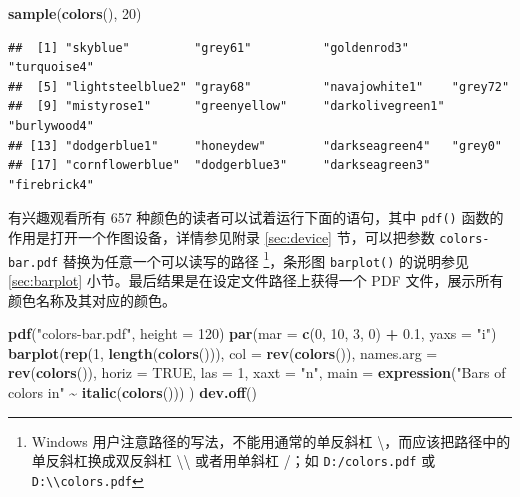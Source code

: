 \documentclass[
  b5paper,
  UTF8,twoside]{book}
\newenvironment{Shaded}{\begin{snugshade}}{\end{snugshade}}
\newcommand{\AttributeTok}[1]{\textcolor[rgb]{0.13,0.29,0.53}{#1}}
\newcommand{\ConstantTok}[1]{\textcolor[rgb]{0.56,0.35,0.01}{#1}}
\newcommand{\DecValTok}[1]{\textcolor[rgb]{0.00,0.00,0.81}{#1}}
\newcommand{\FloatTok}[1]{\textcolor[rgb]{0.00,0.00,0.81}{#1}}
\newcommand{\FunctionTok}[1]{\textcolor[rgb]{0.13,0.29,0.53}{\textbf{#1}}}
\newcommand{\NormalTok}[1]{#1}
\newcommand{\SpecialCharTok}[1]{\textcolor[rgb]{0.81,0.36,0.00}{\textbf{#1}}}
\newcommand{\StringTok}[1]{\textcolor[rgb]{0.31,0.60,0.02}{#1}}
\begin{document}
\begin{Shaded}
\begin{Highlighting}[]
\FunctionTok{sample}\NormalTok{(}\FunctionTok{colors}\NormalTok{(), }\DecValTok{20}\NormalTok{)}
\end{Highlighting}
\end{Shaded}

\begin{verbatim}
##  [1] "skyblue"         "grey61"          "goldenrod3"      "turquoise4"     
##  [5] "lightsteelblue2" "gray68"          "navajowhite1"    "grey72"         
##  [9] "mistyrose1"      "greenyellow"     "darkolivegreen1" "burlywood4"     
## [13] "dodgerblue1"     "honeydew"        "darkseagreen4"   "grey0"          
## [17] "cornflowerblue"  "dodgerblue3"     "darkseagreen3"   "firebrick4"
\end{verbatim}

有兴趣观看所有 657 种颜色的读者可以试着运行下面的语句，其中 \texttt{pdf()} 函数的作用是打开一个作图设备，详情参见附录 \ref{sec:device} 节，可以把参数 \texttt{\textquotesingle{}colors-bar.pdf\textquotesingle{}} 替换为任意一个可以读写的路径 \footnote{Windows 用户注意路径的写法，不能用通常的单反斜杠 \textbackslash，而应该把路径中的单反斜杠换成双反斜杠 \textbackslash\textbackslash{} 或者用单斜杠 /；如 \texttt{D:/colors.pdf} 或 \texttt{D:\textbackslash{}\textbackslash{}colors.pdf}}，条形图 \texttt{barplot()} 的说明参见 \ref{sec:barplot} 小节。最后结果是在设定文件路径上获得一个 PDF 文件，展示所有颜色名称及其对应的颜色。

\begin{Shaded}
\begin{Highlighting}[]
\FunctionTok{pdf}\NormalTok{(}\StringTok{"colors{-}bar.pdf"}\NormalTok{, }\AttributeTok{height =} \DecValTok{120}\NormalTok{)}
\FunctionTok{par}\NormalTok{(}\AttributeTok{mar =} \FunctionTok{c}\NormalTok{(}\DecValTok{0}\NormalTok{, }\DecValTok{10}\NormalTok{, }\DecValTok{3}\NormalTok{, }\DecValTok{0}\NormalTok{) }\SpecialCharTok{+} \FloatTok{0.1}\NormalTok{, }\AttributeTok{yaxs =} \StringTok{"i"}\NormalTok{)}
\FunctionTok{barplot}\NormalTok{(}\FunctionTok{rep}\NormalTok{(}\DecValTok{1}\NormalTok{, }\FunctionTok{length}\NormalTok{(}\FunctionTok{colors}\NormalTok{())),}
  \AttributeTok{col =} \FunctionTok{rev}\NormalTok{(}\FunctionTok{colors}\NormalTok{()), }\AttributeTok{names.arg =} \FunctionTok{rev}\NormalTok{(}\FunctionTok{colors}\NormalTok{()), }\AttributeTok{horiz =} \ConstantTok{TRUE}\NormalTok{,}
  \AttributeTok{las =} \DecValTok{1}\NormalTok{, }\AttributeTok{xaxt =} \StringTok{"n"}\NormalTok{, }\AttributeTok{main =} \FunctionTok{expression}\NormalTok{(}\StringTok{"Bars of colors in"} \SpecialCharTok{\textasciitilde{}} \FunctionTok{italic}\NormalTok{(}\FunctionTok{colors}\NormalTok{()))}
\NormalTok{)}
\FunctionTok{dev.off}\NormalTok{()}
\end{Highlighting}
\end{Shaded}
\end{document}
